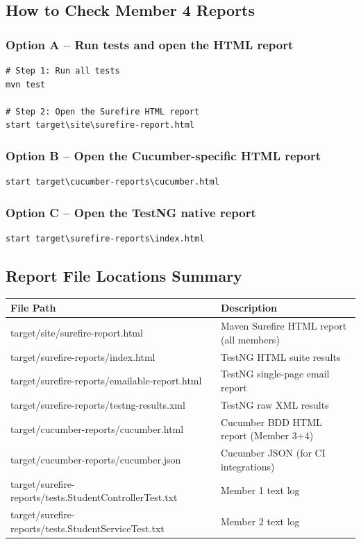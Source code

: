 \documentclass[12pt,a4paper]{article}
\begin{document}
\subsection{How to Check Member 4 Reports}

\subsubsection{Option A -- Run tests and open the HTML report}

\begin{lstlisting}[style=shellStyle, numbers=none]
# Step 1: Run all tests
mvn test

# Step 2: Open the Surefire HTML report
start target\site\surefire-report.html
\end{lstlisting}

\subsubsection{Option B -- Open the Cucumber-specific HTML report}

\begin{lstlisting}[style=shellStyle, numbers=none]
start target\cucumber-reports\cucumber.html
\end{lstlisting}

\subsubsection{Option C -- Open the TestNG native report}

\begin{lstlisting}[style=shellStyle, numbers=none]
start target\surefire-reports\index.html
\end{lstlisting}

\subsection{Report File Locations Summary}

\begin{tabularx}{\textwidth}{>{\ttfamily\small}lX}
\toprule
\textbf{File Path} & \textbf{Description} \\
\midrule
target/site/surefire-report.html & Maven Surefire HTML report (all members) \\
target/surefire-reports/index.html & TestNG HTML suite results \\
target/surefire-reports/emailable-report.html & TestNG single-page email report \\
target/surefire-reports/testng-results.xml & TestNG raw XML results \\
target/cucumber-reports/cucumber.html & Cucumber BDD HTML report (Member 3+4) \\
target/cucumber-reports/cucumber.json & Cucumber JSON (for CI integrations) \\
target/surefire-reports/tests.StudentControllerTest.txt & Member 1 text log \\
target/surefire-reports/tests.StudentServiceTest.txt & Member 2 text log \\
\bottomrule
\end{tabularx}
\end{document}
